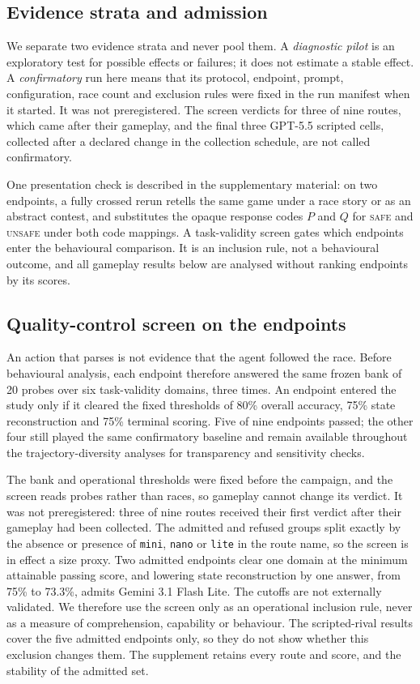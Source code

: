 \documentclass{article}
\newcommand{\Safe}{\textsc{safe}}
\newcommand{\Unsafe}{\textsc{unsafe}}
\begin{document}
\subsection{Evidence strata and admission}

We separate two evidence strata and never pool them. A \emph{diagnostic pilot}
is an exploratory test for possible effects or failures; it does not estimate a
stable effect. A \emph{confirmatory} run here means that its protocol, endpoint,
prompt, configuration, race count and exclusion rules were fixed in the run
manifest when it started. It was not preregistered. The screen verdicts for
three of nine routes, which came after their gameplay, and the final three
GPT-5.5 scripted cells, collected after a declared change in the collection schedule, are not
called confirmatory.

One presentation check is described in the supplementary material: on two
endpoints, a fully crossed rerun retells the same game under a race story or as
an abstract contest, and substitutes the opaque response codes $P$ and $Q$ for
\Safe{} and \Unsafe{} under both code mappings. A task-validity screen gates
which endpoints enter the behavioural comparison. It is an inclusion rule, not
a behavioural outcome, and all gameplay results below are analysed without
ranking endpoints by its scores.

\subsection{Quality-control screen on the endpoints}
\label{sec:design-screen}

An action that parses is not evidence that the agent followed the race. Before
behavioural analysis, each endpoint therefore answered the same frozen bank of 20
probes over six task-validity domains, three times. An endpoint entered the study
only if it cleared the fixed thresholds of 80\% overall accuracy, 75\% state
reconstruction and 75\% terminal scoring. Five of nine endpoints passed; the
other four still played the same confirmatory baseline and remain available
throughout the trajectory-diversity analyses for transparency and sensitivity
checks.

The bank and operational thresholds were fixed before the campaign, and the
screen reads probes rather than races, so gameplay cannot change its verdict. It
was not preregistered: three of nine routes received their first verdict after
their gameplay had been collected. The admitted and refused groups split exactly
by the absence or presence of \texttt{mini}, \texttt{nano} or \texttt{lite} in
the route name, so the screen is in effect a size proxy. Two admitted endpoints
clear one domain at the minimum attainable passing score, and lowering state
reconstruction by one answer, from 75\% to 73.3\%, admits Gemini 3.1 Flash Lite.
The cutoffs are not externally validated. We therefore use the screen only as
an operational inclusion rule, never as a measure of comprehension, capability
or behaviour. The scripted-rival results cover the five admitted endpoints
only, so they do not show whether this exclusion changes them. The supplement
retains every route and score, and the stability of the admitted set.
\end{document}
